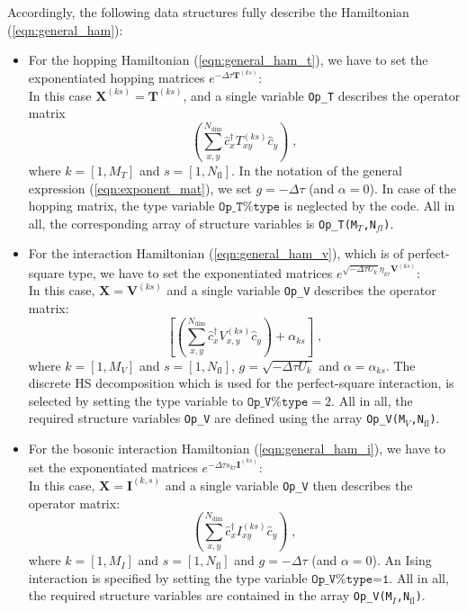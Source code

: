 Accordingly, the following data structures fully describe the  Hamiltonian (\ref{eqn:general_ham}):
\begin{itemize}
\item For the hopping Hamiltonian (\ref{eqn:general_ham_t}), we have to set the exponentiated hopping matrices $ e^{-\Delta \tau {\bm T}^{(ks)}}$: \\
In this case $\bm{X}^{(ks)}=\bm{T}^{(ks)}$, and a single variable  \texttt{Op\_T}  describes the operator matrix
\begin{equation}
            \left( \sum_{x,y}^{N_{\mathrm{dim}}} \hat{c}^{\dagger}_x T_{xy}^{(ks)} \hat{c}^{\phantom{\dagger}}_{y}  \right)  \;,
\end{equation} 
where $k=[1, M_{T}]$ and $s=[1, N_{\mathrm{fl}}]$. In the notation of the general expression (\ref{eqn:exponent_mat}), we set $g=-\Delta \tau$ (and $\alpha = 0$).
In case of the hopping matrix, the type variable $\texttt{Op\_T\%type}$  is neglected by the code. 
All in all, the corresponding array of structure variables is  \texttt{Op\_T(M$_T$,N$_{fl}$)}.

\item For the interaction Hamiltonian (\ref{eqn:general_ham_v}), which is of perfect-square type, we have to set the exponentiated matrices $e^{  \sqrt{ -  \Delta \tau  U_k} \eta_{k\tau} {\bm V}^{(ks)} }$:\\
In this case, $\bm{X}  = \bm{V}^{(ks)}$ and a single variable  \texttt{Op\_V}  describes the operator matrix:
\begin{equation}
             \left[ \left( \sum_{x,y}^{N_{\mathrm{dim}}} \hat{c}^{\dagger}_x V_{x,y}^{(ks)} \hat{c}^{\phantom{\dagger}}_{y}  \right)  + \alpha_{ks} \right]  \;,
\end{equation} 
where $k=[1, M_{V}]$ and $s=[1, N_{\mathrm{fl}}]$, $g = \sqrt{-\Delta \tau  U_k}$ and  $\alpha = \alpha_{ks}$. 
The discrete HS decomposition which is used for the perfect-square interaction, is selected by setting the type variable to $\texttt{Op\_V\%type}=2$.
All in all, the required structure variables \texttt{Op\_V} are defined  using the array \texttt{Op\_V(M$_V$,N$_\mathrm{fl}$)}.

\item For the bosonic interaction Hamiltonian (\ref{eqn:general_ham_i}), we have to set the exponentiated matrices $e^{  -\Delta \tau s_{k\tau}  {\bm I}^{(ks)}}$:\\
In this case, $\bm{X}  = \bm{I}^{(k,s)} $ and a single variable  \texttt{Op\_V} then  describes the operator matrix:
\begin{equation}
            \left( \sum_{x,y}^{N_{\mathrm{dim}}} \hat{c}^{\dagger}_x I_{xy}^{(ks)} \hat{c}^{\phantom{\dagger}}_{y}  \right)  \;,
\end{equation} 
where $k=[1, M_{I}]$ and $s=[1, N_{\mathrm{fl}}]$ and $g = -\Delta \tau$ (and $\alpha = 0$).
An Ising interaction is specified by setting the type variable  $\texttt{Op\_V\%type=1}$. 
All in all, the required structure variables are contained in the array \texttt{Op\_V(M$_{I}$,N$_\mathrm{fl}$)}.


\end{itemize}
